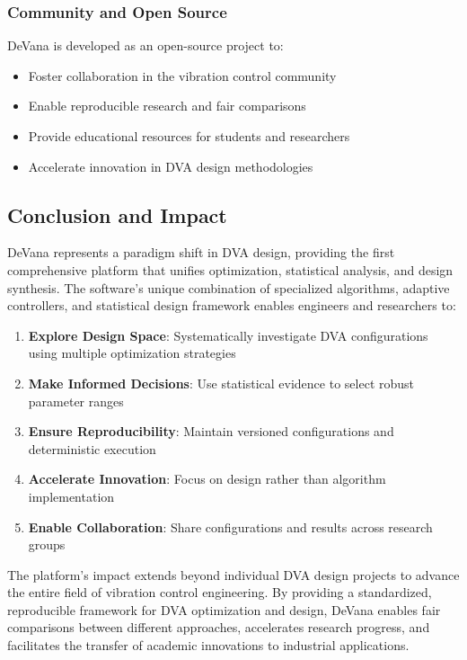 \documentclass[12pt,a4paper]{article}
\newcommand{\softwareName}{DeVana}
\begin{document}
\subsubsection{Community and Open Source}

\softwareName{} is developed as an open-source project to:

\begin{itemize}
    \item Foster collaboration in the vibration control community
    \item Enable reproducible research and fair comparisons
    \item Provide educational resources for students and researchers
    \item Accelerate innovation in DVA design methodologies
\end{itemize}

\subsection{Conclusion and Impact}

\softwareName{} represents a paradigm shift in DVA design, providing the first comprehensive platform that unifies optimization, statistical analysis, and design synthesis. The software's unique combination of specialized algorithms, adaptive controllers, and statistical design framework enables engineers and researchers to:

\begin{enumerate}
    \item \textbf{Explore Design Space}: Systematically investigate DVA configurations using multiple optimization strategies
    \item \textbf{Make Informed Decisions}: Use statistical evidence to select robust parameter ranges
    \item \textbf{Ensure Reproducibility}: Maintain versioned configurations and deterministic execution
    \item \textbf{Accelerate Innovation}: Focus on design rather than algorithm implementation
    \item \textbf{Enable Collaboration}: Share configurations and results across research groups
\end{enumerate}

The platform's impact extends beyond individual DVA design projects to advance the entire field of vibration control engineering. By providing a standardized, reproducible framework for DVA optimization and design, \softwareName{} enables fair comparisons between different approaches, accelerates research progress, and facilitates the transfer of academic innovations to industrial applications.
\end{document}
